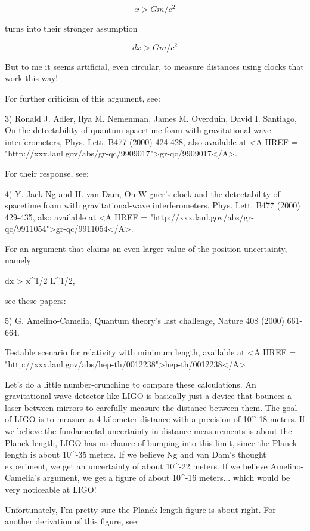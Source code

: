 $$
x > G m / c^{2}
$$
    
turns into their stronger assumption

$$
dx > G m / c^{2}
$$
    
But to me it seems artificial, even circular, to measure distances
using clocks that work this way!

For further criticism of this argument, see:

3) Ronald J. Adler, Ilya M. Nemenman, James M. Overduin, David I. Santiago, 
On the detectability of quantum spacetime foam with gravitational-wave
interferometers, Phys. Lett. B477 (2000) 424-428, also available at
<A HREF = "http://xxx.lanl.gov/abs/gr-qc/9909017">gr-qc/9909017</A>.

For their response, see:

4) Y. Jack Ng and H. van Dam, On Wigner's clock and the detectability
of spacetime foam with gravitational-wave interferometers,
Phys. Lett. B477 (2000) 429-435, also available at <A HREF = "http://xxx.lanl.gov/abs/gr-qc/9911054">gr-qc/9911054</A>.

For an argument that claims an even larger value of the position 
uncertainty, namely 

dx > x^{1/2} L^{1/2}, 

see these papers:

5) G. Amelino-Camelia, Quantum theory's last challenge, Nature 408
(2000) 661-664.

Testable scenario for relativity with minimum length, available at
<A HREF = "http://xxx.lanl.gov/abs/hep-th/0012238">hep-th/0012238</A>

Let's do a little number-crunching to compare these calculations.  An
gravitational wave detector like LIGO is basically just a device that
bounces a laser between mirrors to carefully measure the distance
between them.  The goal of LIGO is to measure a 4-kilometer distance
with a precision of 10^{-18} meters.  If we believe the fundamental
uncertainty in distance measurements is about the Planck length, LIGO
has no chance of bumping into this limit, since the Planck length is
about 10^{-35} meters.  If we believe Ng and van Dam's thought
experiment, we get an uncertainty of about 10^{-22} meters.  If we
believe Amelino-Camelia's argument, we get a figure of about 10^{-16}
meters... which would be very noticeable at LIGO!

Unfortunately, I'm pretty sure the Planck length figure is about
right.  For another derivation of this figure, see: 

